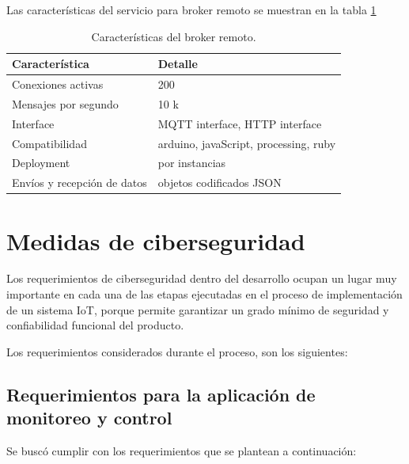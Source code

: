 Las características del servicio para broker remoto se muestran en la tabla  \ref{tab:brokerremoto}

\begin{table}[h]
	\centering
	\caption[Características del broker remoto]{Características del broker remoto.}
	\begin{tabular}{p{5cm} p{7cm} }    
		\toprule
		\textbf{Característica} 	 & \textbf{Detalle}  \\
		\midrule
		Conexiones activas  & 200\\		
		Mensajes por segundo & 10 k \\
		Interface  & MQTT interface, HTTP interface\\		
		Compatibilidad & arduino, javaScript, processing, ruby \\		
		Deployment 	  & por instancias\\
		Envíos y recepción de datos & objetos codificados JSON\\
		
		\bottomrule
		\hline
	\end{tabular}
	\label{tab:brokerremoto}
\end{table}

\section{Medidas de ciberseguridad}

Los requerimientos de ciberseguridad dentro del desarrollo ocupan un lugar muy importante en cada una de las etapas ejecutadas en el proceso de implementación de un sistema IoT, porque permite garantizar un grado mínimo de seguridad y confiabilidad funcional del producto. 

Los requerimientos considerados durante el proceso, son los siguientes:

\subsection{Requerimientos para la aplicación de monitoreo y control}
Se buscó cumplir con los requerimientos que se plantean a continuación:

